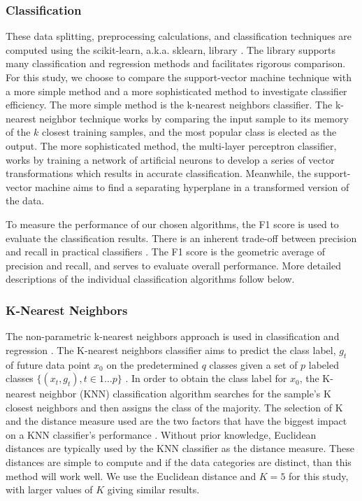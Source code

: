 \subsubsection{Classification}

These data splitting, preprocessing calculations, and classification techniques are 
computed using the scikit-learn, a.k.a. sklearn, library \cite{JMLR:v12:pedregosa11a}.
The library supports many classification and regression methods and facilitates rigorous comparison.
For this study, we choose to compare the support-vector machine technique with a more simple method
and a more sophisticated method to investigate classifier efficiency. 
The more simple method is the k-nearest neighbors classifier.
The k-nearest neighbor technique works by comparing the input sample to its memory of the $k$ closest training samples, 
 and the most popular class is elected as the output.
The more sophisticated method, the multi-layer perceptron classifier, works by training a 
 network of artificial neurons to develop a series of vector transformations which results
 in accurate classification. Meanwhile, the support-vector machine aims to find a separating
 hyperplane in a transformed version of the data. 

To measure the performance of our chosen algorithms, the F1 score is 
used to evaluate the classification results. 
There is an inherent trade-off between precision and recall in practical classifiers \cite{buckland94}.
The F1 score is the geometric average of
precision and recall, and serves to evaluate overall performance. 
More detailed descriptions of the individual classification algorithms follow below.

\subsubsection{K-Nearest Neighbors}

The non-parametric k-nearest neighbors approach is used in classification 
and regression \cite{Vaishnnave12019}.
The K-nearest neighbors classifier aims to predict the class label, $g_t$ of 
future data point $x_0$ on the predetermined $q$ classes given a set 
of $p$ labeled classes $\{(x_t, g_t), t \in 1 \ldots p\}$ \cite{Song2007}. 
In order to obtain the class label for $x_0$, the K-nearest neighbor (KNN)
 classification algorithm searches for the sample's K closest neighbors 
 and then assigns the class of the majority.
The selection of K and the distance measure used are the two factors 
that have the biggest impact on a KNN classifier's performance \cite{Alf2019}. 
Without prior knowledge, Euclidean distances are typically used by the KNN classifier 
as the distance measure. These distances are simple to compute and if the data
categories are distinct, than this method will work well.
We use the Euclidean distance and $K=5$ for this study, with larger values of $K$ giving similar results.

